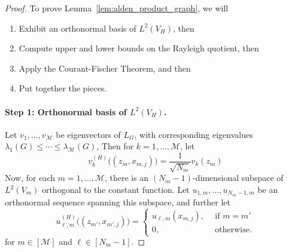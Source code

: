 \documentclass{article}
\newcommand{\1}{\mathbf{1}}
\newcommand{\mc}[1]{\mathcal{#1}}
\theoremstyle{alden}
\theoremstyle{aldenthm}
\theoremstyle{definition}
\theoremstyle{remark}
\begin{document}
\begin{proof}
	To prove Lemma~\ref{lem:alden_product_graph}, we will 
	\begin{enumerate}
		\item Exhibit an orthonormal basis of $L^2(V_H)$, then
		\item Compute upper and lower bounds on the Rayleigh quotient, then
		\item Apply the Courant-Fischer Theorem, and then
		\item Put together the pieces.
	\end{enumerate}

\paragraph{Step 1: Orthonormal basis of $L^2(V_H)$.}
Let $v_1,\ldots,v_{\mc{M}}$ be eigenvectors of $L_G$, with corresponding eigenvalues $\lambda_1(G) \leq \cdots \leq \lambda_{\mc{M}}(G)$, Then for $k = 1,\ldots,\mc{M}$, let
\begin{equation*}
v_k^{(H)}\bigl((z_m,x_{m,j})\bigr) = \frac{1}{\sqrt{N_m}} v_k(z_m) 
\end{equation*}
Now, for each $m = 1,\ldots,\mc{M}$, there is an $(N_m - 1)$-dimensional subspace of $L^2(V_m)$ orthogonal to the constant function. Let $u_{1,m}, \ldots, u_{N_m - 1,m}$ be an orthonormal sequence spanning this subspace, and further let
\begin{equation*}
u_{\ell,m}^{(H)}\bigl((z_{m'},x_{m',j})\bigr) = 
\begin{cases*}
u_{\ell,m}(x_{m,j}),&~~\textrm{if $m = m'$}\\
0,&~~\textrm{otherwise.}
\end{cases*}
\end{equation*}
for $m \in [\mc{M}]$ and $\ell \in [N_m - 1]$. 


\end{proof}
\end{document}
